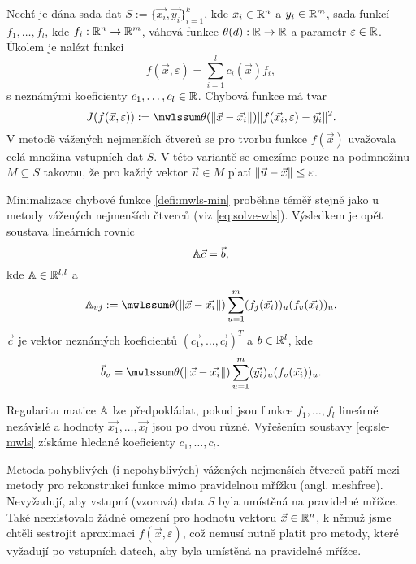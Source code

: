 Nechť je dána sada dat $S := \{\vec{x_i}, \vec{y_i}\}_{i = 1}^k$, kde $x_i \in \mathbb{R}^n$ a $y_i \in \mathbb{R}^m$, sada funkcí $f_1,\ldots,f_l$, kde $f_i: \mathbb{R}^n \rightarrow \mathbb{R}^m$, váhová funkce $\theta(d): \mathbb{R} \rightarrow \mathbb{R}$ a parametr $\varepsilon \in \mathbb{R}$. Úkolem je nalézt funkci
\[
  f(\vec{x},\varepsilon) = \sum_{i=1}^lc_i(\vec{x})f_i,
\]
s neznámými koeficienty $c_1, \ldots, c_l \in \mathbb{R}$. Chybová funkce má tvar
\begin{equation}
  \label{defi:mwls-min}
  J(f(\vec{x},\varepsilon)) := \mwlssum \theta(\norm{\vec{x} - \vec{x_i}})\norm{f(\vec{x_i}, \varepsilon) - \vec{y_i}}^2.
\end{equation}
V metodě vážených nejmenších čtverců se pro tvorbu funkce $f(\vec{x})$ uvažovala celá množina vstupních dat $S$. V této variantě se omezíme pouze na podmnožinu $M \subseteq S$ takovou, že pro každý vektor $\vec{u} \in M$ platí $\|\vec{u} - \vec{x}\| \leq \varepsilon$.

Minimalizace chybové funkce \ref{defi:mwls-min} proběhne téměř stejně jako u metody vážených nejmenších čtverců (viz \ref{eq:solve-wls}). Výsledkem je opět soustava lineárních rovnic
\begin{equation}
  \label{eq:sle-mwls}
  \mathbb{A}\vec{c} = \vec{b},
\end{equation}
kde $\mathbb{A} \in \mathbb{R}^{l,l}$ a
\begin{equation}
  \label{eq:solve-mwls-lhs}
  \mx{A}_{vj} := \mwlssum \theta(\norm{\vec{x} - \vec{x_i}}) \sum_{u = 1}^m (f_j(\vec{x_i}))_u (f_v(\vec{x_i}))_u,
\end{equation}
$\vec{c}$ je vektor neznámých koeficientů $(\vec{c_1}, \ldots, \vec{c_l})^T$ a $b \in \mathbb{R}^l$, kde
\begin{equation}
  \label{eq:solve-mwls-rhs}
  \vec{b}_v = \mwlssum \theta(\norm{\vec{x} - \vec{x_i}}) \sum_{u=1}^m (\vec{y_i})_u(f_v(\vec{x_i}))_u.
\end{equation}

Regularitu matice $\mathbb{A}$ lze předpokládat, pokud jsou funkce $f_1, \ldots, f_l$ lineárně nezávislé a hodnoty $\vec{x_1}, \ldots, \vec{x_l}$ jsou po dvou různé. Vyřešením soustavy \ref{eq:sle-mwls} získáme hledané koeficienty $c_1, \ldots, c_l$.

Metoda pohyblivých (i nepohyblivých) vážených nejmenších čtverců patří mezi metody pro rekonstrukci funkce mimo pravidelnou mřížku (angl. meshfree). Nevyžadují, aby vstupní (vzorová) data $S$ byla umístěná na pravidelné mřížce. Také neexistovalo žádné omezení pro hodnotu vektoru $\vec{x} \in \mathbb{R}^n$, k němuž jsme chtěli sestrojit aproximaci $f(\vec{x}, \varepsilon)$, což nemusí nutně platit pro metody, které vyžadují po vstupních datech, aby byla umístěná na pravidelné mřížce.

